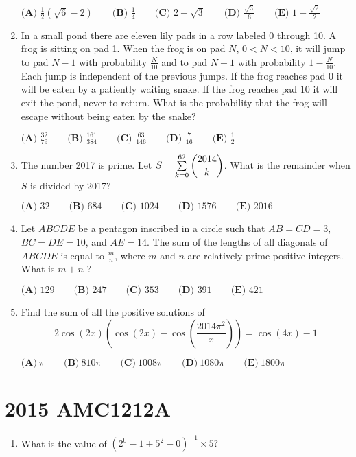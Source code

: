 \documentclass{article}
\begin{document}
\begin{enumerate}[label=\arabic*., itemsep=0.5em]
\( \textbf{(A) }\frac{1}{2}(\sqrt{6}-2)\qquad\textbf{(B) }\frac{1}{4}\qquad\textbf{(C) }2-\sqrt{3}\qquad\textbf{(D) }\frac{\sqrt{3}}{6}\qquad\textbf{(E) } 1-\frac{\sqrt{2}}{2}\)\par \vspace{0.5em}\item In a small pond there are eleven lily pads in a row labeled 0 through 10.  A frog is sitting on pad 1.  When the frog is on pad \(N\), \(0<N<10\), it will jump to pad \(N-1\) with probability \(\frac{N}{10}\) and to pad \(N+1\) with probability \(1-\frac{N}{10}\).  Each jump is independent of the previous jumps.  If the frog reaches pad 0 it will be eaten by a patiently waiting snake.  If the frog reaches pad 10 it will exit the pond, never to return.  What is the probability that the frog will escape without being eaten by the snake?

\(\textbf{(A) }\frac{32}{79}\qquad
\textbf{(B) }\frac{161}{384}\qquad
\textbf{(C) }\frac{63}{146}\qquad
\textbf{(D) }\frac{7}{16}\qquad
\textbf{(E) }\frac{1}{2}\qquad\)\par \vspace{0.5em}\item The number 2017 is prime.  Let \(S = \sum \limits_{k=0}^{62} \dbinom{2014}{k}\).  What is the remainder when \(S\) is divided by 2017?

\(\textbf{(A) }32\qquad
\textbf{(B) }684\qquad
\textbf{(C) }1024\qquad
\textbf{(D) }1576\qquad
\textbf{(E) }2016\qquad\)\par \vspace{0.5em}\item Let \(ABCDE\) be a pentagon inscribed in a circle such that \(AB = CD = 3\), \(BC = DE = 10\), and \(AE= 14\).  The sum of the lengths of all diagonals of \(ABCDE\) is equal to \(\frac{m}{n}\), where \(m\) and \(n\) are relatively prime positive integers.  What is \(m+n\) ?

\(\textbf{(A) }129\qquad
\textbf{(B) }247\qquad
\textbf{(C) }353\qquad
\textbf{(D) }391\qquad
\textbf{(E) }421\qquad\)\par \vspace{0.5em}\item Find the sum of all the positive solutions of 
\begin{equation*}
2\cos(2x) \left(\cos(2x) - \cos\left( \frac{2014\pi^2}{x} \right)\right) = \cos(4x) - 1
\end{equation*}


\( \textbf{(A)}\ \pi \qquad\textbf{(B)}\ 810\pi  \qquad\textbf{(C)}\ 1008\pi \qquad\textbf{(D)}\ 1080 \pi \qquad\textbf{(E)}\ 1800\pi \)\par \vspace{0.5em}\end{enumerate}\newpage\section*{2015 AMC1212A}\begin{enumerate}[label=\arabic*., itemsep=0.5em]\item What is the value of \((2^0-1+5^2-0)^{-1}\times5?\)


\end{enumerate}
\end{document}
